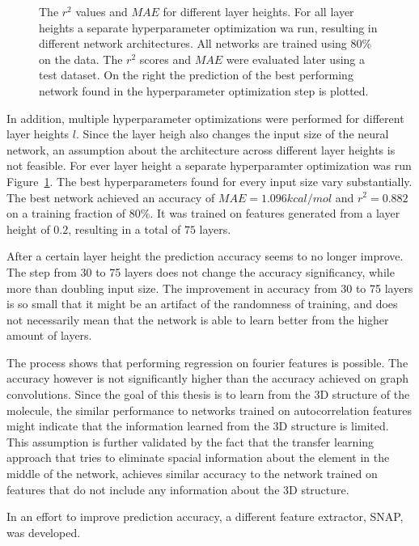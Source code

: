 \begin{figure}[!htb]
    \endminipage
    \caption[Evaluation of LEFD models]{
    The $r^2$ values and $MAE$ for different layer heights.
    For all layer heights a separate hyperparameter optimization wa run, resulting in different network architectures.
    All networks are trained using 80\% on the data. The $r^2$ scores and $MAE$ were evaluated later using a test dataset.
    On the right the prediction of the best performing network found in the hyperparameter optimization step is plotted.
    }
    \label{fig:fourier_final}
\end{figure}


In addition, multiple hyperparameter optimizations were performed for different layer heights $l$.
Since the layer heigh also changes the input size of the neural network, an assumption about the 
architecture across different layer heights is not feasible.
For ever layer height a separate hyperparamter optimization was run Figure~\ref{fig:fourier_final}.
The best hyperparameters found for every input size vary substantially.
The best network achieved an accuracy of $MAE=1.096 kcal/mol$ and $r^2=0.882$ on a training fraction of 80\%.
It was trained on features generated from a layer height of $0.2$, resulting in a total of $75$ layers.

After a certain layer height the prediction accuracy seems to no longer improve.
The step from 30 to 75 layers does not change the accuracy significancy, while more than doubling input size.
The improvement in accuracy from 30 to 75 layers is so small that it might be an artifact of the 
randomness of training, and does not necessarily mean that the network is able to learn better from the higher amount of layers.

The process shows that performing regression on fourier features is possible.
The accuracy however is not significantly higher than the accuracy achieved on graph convolutions.
Since the goal of this thesis is to learn from the 3D structure of the molecule, the similar performance to networks trained on autocorrelation features
might indicate that the information learned from the 3D structure is limited.
This assumption is further validated by the fact that the transfer learning approach that 
tries to eliminate spacial information about the element in the middle of the network, achieves similar accuracy to the 
network trained on features that do not include any information about the 3D structure.

In an effort to improve prediction accuracy, a different feature extractor, SNAP, was developed.

